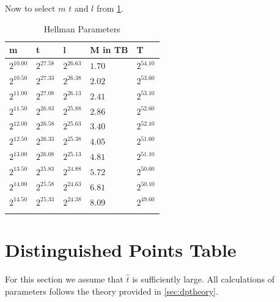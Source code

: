 Now to select $m$ $t$ and $l$ from \ref{tab:hellparam}.
\begin{table}[H]
  \centering
\begin{tabular}{lllll}
m & t & l & M in TB & T \\\hline
$2^{10.00}$ & $2^{27.58}$ & $2^{26.63}$ & $1.70$ & $2^{54.10}$ \\
$2^{10.50}$ & $2^{27.33}$ & $2^{26.38}$ & $2.02$ & $2^{53.60}$ \\
$2^{11.00}$ & $2^{27.08}$ & $2^{26.13}$ & $2.41$ & $2^{53.10}$ \\
$2^{11.50}$ & $2^{26.83}$ & $2^{25.88}$ & $2.86$ & $2^{52.60}$ \\
$2^{12.00}$ & $2^{26.58}$ & $2^{25.63}$ & $3.40$ & $2^{52.10}$ \\
$2^{12.50}$ & $2^{26.33}$ & $2^{25.38}$ & $4.05$ & $2^{51.60}$ \\
$2^{13.00}$ & $2^{26.08}$ & $2^{25.13}$ & $4.81$ & $2^{51.10}$ \\
$2^{13.50}$ & $2^{25.83}$ & $2^{24.88}$ & $5.72$ & $2^{50.60}$ \\
$2^{14.00}$ & $2^{25.58}$ & $2^{24.63}$ & $6.81$ & $2^{50.10}$ \\
$2^{14.50}$ & $2^{25.33}$ & $2^{24.38}$ & $8.09$ & $2^{49.60}$ \\
 &  &  &  &  &  \\
\end{tabular}
  \caption{Hellman Parameters}
  \label{tab:hellparam}
\end{table}


\section{Distinguished Points Table}
For this section we assume that $\hat{t}$ is sufficiently large.
All calculations of parameters follows the theory provided in \ref{sec:dptheory}.

